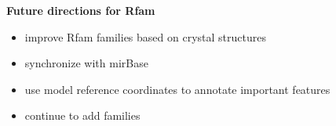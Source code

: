 \documentclass[landscape]{slides}
\begin{document}
\begin{slide}
\begin{center}
  \textbf{Future directions for Rfam}
  \begin{itemize}  
  \item improve Rfam families based on crystal structures
  \item synchronize with mirBase
  \item use model reference coordinates to annotate important features 
  \item continue to add families
  \end{itemize}
\end{center}    
\vfill
\end{slide}
\end{document}

